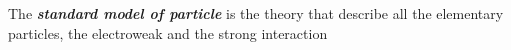 \documentclass[10pt]{article}
\begin{document}
	The \textbf{\emph{standard model of particle}} is the theory that describe all the elementary particles, the electroweak \cite{PhysRevLett.19.1264} and the strong interaction 
	
	
\printbibliography
\end{document}

